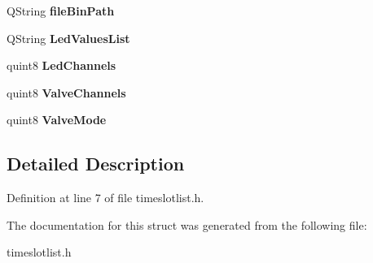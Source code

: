 \begin{DoxyCompactItemize}
Q\+String {\bfseries file\+Bin\+Path}
\item 
\mbox{\label{structtime_slot_item_ad89dc59d6c1e3a9e6bccfd73f08749b3}} 
Q\+String {\bfseries Led\+Values\+List}
\item 
\mbox{\label{structtime_slot_item_aa4e617582e427c315d09c5c7b36db8d6}} 
quint8 {\bfseries Led\+Channels}
\item 
\mbox{\label{structtime_slot_item_a54c7fe8430f5a93444f6ade27d78a18d}} 
quint8 {\bfseries Valve\+Channels}
\item 
\mbox{\label{structtime_slot_item_a6d46f1f32495c6a9b186cd775d095ba1}} 
quint8 {\bfseries Valve\+Mode}
\end{DoxyCompactItemize}


\subsection{Detailed Description}


Definition at line 7 of file timeslotlist.\+h.



The documentation for this struct was generated from the following file\+:\begin{DoxyCompactItemize}
\item 
timeslotlist.\+h\end{DoxyCompactItemize}
